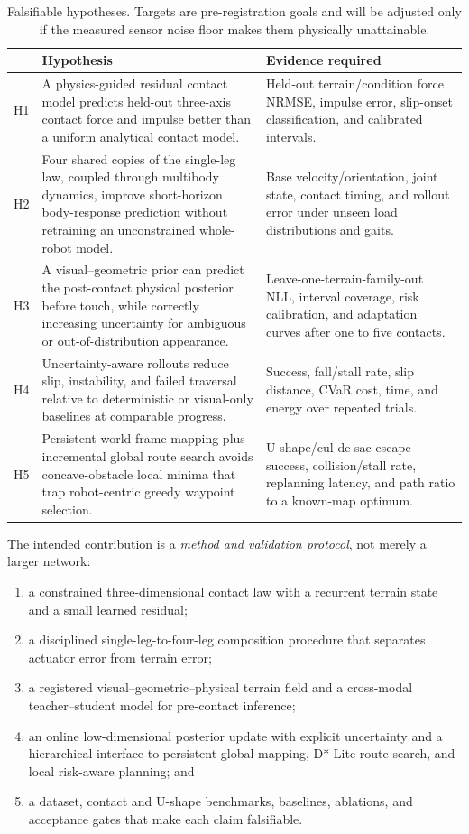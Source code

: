\begin{table}[ht]
\centering
\caption{Falsifiable hypotheses. Targets are pre-registration goals and will be adjusted only if the measured sensor noise floor makes them physically unattainable.}
\label{tab:hypotheses}
\begin{tabularx}{\textwidth}{@{}C{9mm}Y Y@{}}
\toprule
 & \textbf{Hypothesis} & \textbf{Evidence required}\\
\midrule
H1 & A physics-guided residual contact model predicts held-out three-axis contact force and impulse better than a uniform analytical contact model. & Held-out terrain/condition force NRMSE, impulse error, slip-onset classification, and calibrated intervals.\\
H2 & Four shared copies of the single-leg law, coupled through multibody dynamics, improve short-horizon body-response prediction without retraining an unconstrained whole-robot model. & Base velocity/orientation, joint state, contact timing, and rollout error under unseen load distributions and gaits.\\
H3 & A visual--geometric prior can predict the post-contact physical posterior before touch, while correctly increasing uncertainty for ambiguous or out-of-distribution appearance. & Leave-one-terrain-family-out NLL, interval coverage, risk calibration, and adaptation curves after one to five contacts.\\
H4 & Uncertainty-aware rollouts reduce slip, instability, and failed traversal relative to deterministic or visual-only baselines at comparable progress. & Success, fall/stall rate, slip distance, CVaR cost, time, and energy over repeated trials.\\
H5 & Persistent world-frame mapping plus incremental global route search avoids concave-obstacle local minima that trap robot-centric greedy waypoint selection. & U-shape/cul-de-sac escape success, collision/stall rate, replanning latency, and path ratio to a known-map optimum.\\
\bottomrule
\end{tabularx}
\end{table}

The intended contribution is a \emph{method and validation protocol}, not merely a larger network:
\begin{enumerate}
  \item a constrained three-dimensional contact law with a recurrent terrain state and a small learned residual;
  \item a disciplined single-leg-to-four-leg composition procedure that separates actuator error from terrain error;
  \item a registered visual--geometric--physical terrain field and a cross-modal teacher--student model for pre-contact inference;
  \item an online low-dimensional posterior update with explicit uncertainty and a hierarchical interface to persistent global mapping, D* Lite route search, and local risk-aware planning; and
  \item a dataset, contact and U-shape benchmarks, baselines, ablations, and acceptance gates that make each claim falsifiable.
\end{enumerate}

